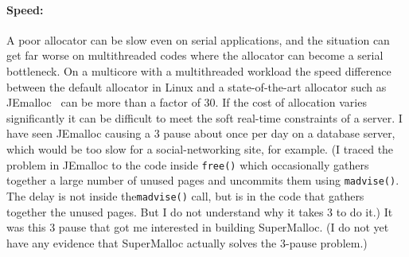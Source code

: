 \documentclass[natbib,sort&compress]{sigplanconf}
\newcommand{\code}[1]{\texttt{#1}}
\begin{document}
{\paragraph{Speed:}} A poor allocator can be slow even on serial
applications, and the situation can get far worse on multithreaded
codes where the allocator can become a serial bottleneck.  On a
multicore with a multithreaded workload the speed difference between
the default allocator in Linux \cite{Lea96} and a state-of-the-art
allocator such as JEmalloc~\cite{Evans06} can be more than a factor of
30.  If the cost of allocation varies significantly it can be
difficult to meet the soft real-time constraints of a server.  I have
seen JEmalloc causing a \unit{3}\second{} pause about once per day on
a database server, which would be too slow for a social-networking
site, for example. (I traced the problem in JEmalloc to the code
inside \code{free()} which occasionally gathers together a large
number of unused pages and uncommits them using \code{madvise()}.  The
delay is not inside the\code{madvise()} call, but is in the code that
gathers together the unused pages.  But I do not understand why it
takes \unit{3}\second{} to do it.)  It was this \unit{3}\second{}
pause that got me interested in building SuperMalloc.  (I do not yet
have any evidence that SuperMalloc actually solves the
\unit{3}\second{}-pause problem.)
\end{document}
